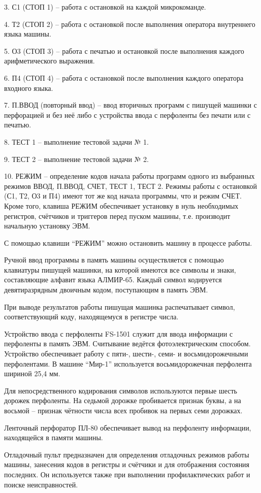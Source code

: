 \documentclass[11pt]{article}
\begin{document}
3. С1 (СТОП 1) – работа с остановкой на
каждой микрокоманде.

4. Т2 (СТОП 2) – работа с остановкой после
выполнения оператора внутреннего
языка машины.

5. О3 (СТОП 3) – работа с печатью и
остановкой после выполнения каждого
арифметического выражения.

6. П4 (СТОП 4) – работа с остановкой после
выполнения каждого оператора входного
языка.

7. П.ВВОД (повторный ввод) – ввод
вторичных программ с пишущей машинки с
перфорацией и без неё либо с устройства
ввода с перфоленты без печати или с
печатью.

8. ТЕСТ 1 – выполнение тестовой задачи №
1.

9. ТЕСТ 2 – выполнение тестовой задачи №
2.

10. РЕЖИМ – определение кодов начала
работы программ одного из выбранных
режимов ВВОД, П.ВВОД, СЧЕТ, ТЕСТ 1, ТЕСТ 2.
Режимы работы с остановкой (С1, Т2, О3 и П4)
имеют тот же код начала программы, что и
режим СЧЕТ. Кроме того, клавиша РЕЖИМ
обеспечивает установку в нуль
необходимых регистров, счётчиков и
триггеров перед пуском машины, т.е.
производит начальную установку ЭВМ.

С помощью клавиши “РЕЖИМ” можно
остановить машину в процессе работы.

Ручной ввод программы в память машины
осуществляется с помощью клавиатуры
пишущей машинки, на которой имеются все
символы и знаки, составляющие алфавит
языка АЛМИР-65. Каждый символ кодируется
девятиразрядным двоичным кодом,
поступающим в память ЭВМ.

При выводе результатов работы пишущая
машинка распечатывает символ,
соответствующий коду, находящемуся в
регистре числа.

Устройство ввода с перфоленты FS-1501
служит для ввода информации с
перфоленты в память ЭВМ. Считывание
ведётся фотоэлектрическим способом.
Устройство обеспечивает работу с пяти-,
шести-, семи- и восьмидорожечными
перфолентами. В машине “Мир-1”
используется восьмидорожечная
перфолента шириной 25,4 мм.

Для непосредственного кодирования
символов используются первые шесть
дорожек перфоленты. На седьмой дорожке
пробивается признак буквы, а на восьмой
– признак чётности числа всех пробивок
на первых семи дорожках.

Ленточный перфоратор ПЛ-80 обеспечивает
вывод на перфоленту информации,
находящейся в памяти машины.

Отладочный пульт предназначен для
определения отладочных режимов работы
машины, занесения кодов в регистры и
счётчики и для отображения состояния
последних. Он используется также при
выполнении профилактических работ и
поиске неисправностей.
\end{document}
